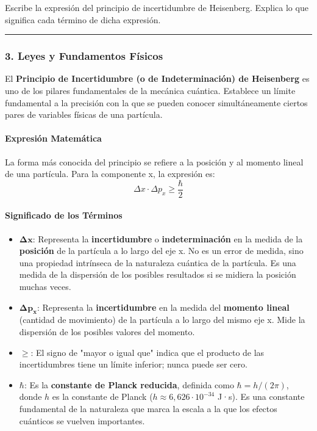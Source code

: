 \begin{cajaenunciado}
Escribe la expresión del principio de incertidumbre de Heisenberg. Explica lo que significa cada término de dicha expresión.
\end{cajaenunciado}
\hrule

\subsubsection*{3. Leyes y Fundamentos Físicos}
El \textbf{Principio de Incertidumbre (o de Indeterminación) de Heisenberg} es uno de los pilares fundamentales de la mecánica cuántica. Establece un límite fundamental a la precisión con la que se pueden conocer simultáneamente ciertos pares de variables físicas de una partícula.

\paragraph*{Expresión Matemática}
La forma más conocida del principio se refiere a la posición y al momento lineal de una partícula. Para la componente x, la expresión es:
$$\Delta x \cdot \Delta p_x \ge \frac{\hbar}{2}$$

\paragraph*{Significado de los Términos}
\begin{itemize}
    \item $\boldsymbol{\Delta x}$: Representa la \textbf{incertidumbre} o \textbf{indeterminación} en la medida de la \textbf{posición} de la partícula a lo largo del eje x. No es un error de medida, sino una propiedad intrínseca de la naturaleza cuántica de la partícula. Es una medida de la dispersión de los posibles resultados si se midiera la posición muchas veces.
    \item $\boldsymbol{\Delta p_x}$: Representa la \textbf{incertidumbre} en la medida del \textbf{momento lineal} (cantidad de movimiento) de la partícula a lo largo del mismo eje x. Mide la dispersión de los posibles valores del momento.
    \item $\boldsymbol{\ge}$: El signo de "mayor o igual que" indica que el producto de las incertidumbres tiene un límite inferior; nunca puede ser cero.
    \item $\boldsymbol{\hbar}$: Es la \textbf{constante de Planck reducida}, definida como $\hbar = h/(2\pi)$, donde $h$ es la constante de Planck ($h \approx 6,626 \cdot 10^{-34}$ J·s). Es una constante fundamental de la naturaleza que marca la escala a la que los efectos cuánticos se vuelven importantes.
\end{itemize}

